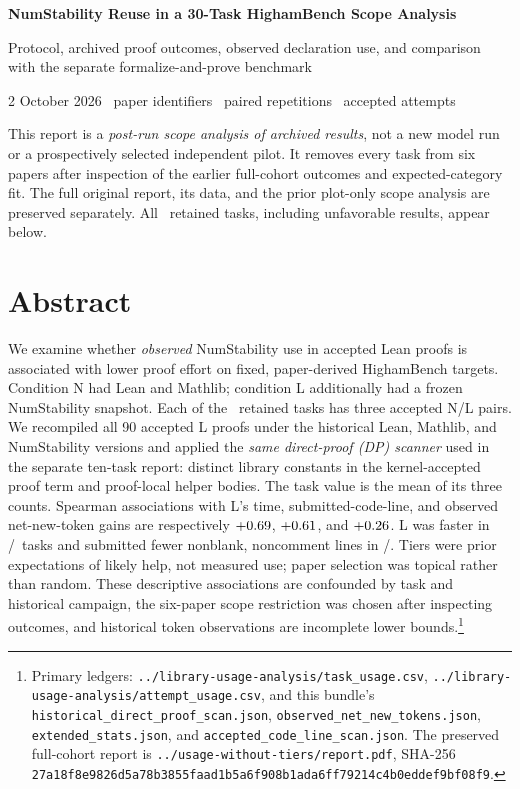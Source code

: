 \documentclass[10pt]{article}
\newcommand{\pathref}[1]{\nolinkurl{#1}}
\begin{document}
\begin{center}
{\LARGE\bfseries\color{Ink}NumStability Reuse in a 30-Task HighamBench Scope Analysis}\par
\vspace{3pt}
{\large Protocol, archived proof outcomes, observed declaration use, and comparison with the separate formalize-and-prove benchmark}\par
\vspace{5pt}
{\small 2 October 2026 \quad\textbar\quad \ReportPapers\ paper identifiers \quad\textbar\quad \ReportPairs\ paired repetitions \quad\textbar\quad \ReportAttempts\ accepted attempts}
\end{center}

\colorbox{Pale}{\parbox{0.975\linewidth}{\small
This report is a \emph{post-run scope analysis of archived results}, not a new model run or a prospectively selected independent pilot. It removes every task from six papers after inspection of the earlier full-cohort outcomes and expected-category fit. The full original report, its data, and the prior plot-only scope analysis are preserved separately. All \ReportTasks\ retained tasks, including unfavorable results, appear below.}}

\section*{Abstract}
We examine whether \emph{observed} NumStability use in accepted Lean proofs is associated with lower proof effort on fixed, paper-derived HighamBench targets. Condition N had Lean and Mathlib; condition L additionally had a frozen NumStability snapshot. Each of the \ReportTasks\ retained tasks has three accepted N/L pairs. We recompiled all 90 accepted L proofs under the historical Lean, Mathlib, and NumStability versions and applied the \emph{same direct-proof (DP) scanner} used in the separate ten-task report: distinct library constants in the kernel-accepted proof term and proof-local helper bodies. The task value is the mean of its three counts. Spearman associations with L's time, submitted-code-line, and observed net-new-token gains are respectively $+0.69$, $+0.61$, and $+0.26$. L was faster in \TimeBetterTasks/\ReportTasks\ tasks and submitted fewer nonblank, noncomment lines in \LocBetterTasks/\ReportTasks. Tiers were prior expectations of likely help, not measured use; paper selection was topical rather than random. These descriptive associations are confounded by task and historical campaign, the six-paper scope restriction was chosen after inspecting outcomes, and historical token observations are incomplete lower bounds.\footnote{Primary ledgers: \pathref{../library-usage-analysis/task_usage.csv}, \pathref{../library-usage-analysis/attempt_usage.csv}, and this bundle's \pathref{historical_direct_proof_scan.json}, \pathref{observed_net_new_tokens.json}, \pathref{extended_stats.json}, and \pathref{accepted_code_line_scan.json}. The preserved full-cohort report is \pathref{../usage-without-tiers/report.pdf}, SHA-256 \texttt{27a18f8e9826d5a78b3855faad1b5a6f908b1ada6ff79214c4b0eddef9bf08f9}.}
\end{document}
